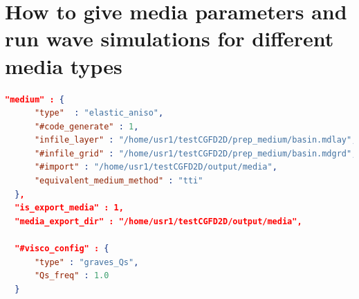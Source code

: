 \chapter{How to give media parameters and run wave simulations for different media types}\label{chapter-media}

\begin{lstlisting}[language=json, title=par.json, frame=tb]
  "medium" : {
      "type"  : "elastic_aniso",
      "#code_generate" : 1,
      "infile_layer" : "/home/usr1/testCGFD2D/prep_medium/basin.mdlay",
      "#infile_grid" : "/home/usr1/testCGFD2D/prep_medium/basin.mdgrd",
      "#import" : "/home/usr1/testCGFD2D/output/media",
      "equivalent_medium_method" : "tti"
  },
  "is_export_media" : 1,
  "media_export_dir" : "/home/usr1/testCGFD2D/output/media",

  "#visco_config" : {
      "type" : "graves_Qs",
      "Qs_freq" : 1.0
  } 
\end{lstlisting}

